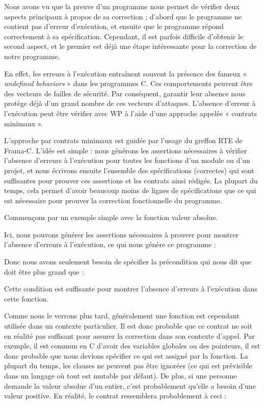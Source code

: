 Nous avons vu que la preuve d'un programme nous permet de vérifier deux aspects
principaux à propos de sa correction ; d'abord que le programme ne contient pas
d'erreur d'exécution, et ensuite que le programme répond correctement à sa
spécification. Cependant, il est parfois difficile d'obtenir le second aspect,
et le premier est déjà une étape intéressante pour la correction de notre programme.


En effet, les erreurs à l'exécution entraînent souvent la présence des fameux
« \textit{undefined behaviors} » dans les programmes C. Ces comportements peuvent être
des vecteurs de failles de sécurité. Par conséquent, garantir leur absence nous
protège déjà d'un grand nombre de ces vecteurs d'attaques. L'absence d'erreur à
l'exécution peut être vérifier avec WP à l'aide d'une approche appelée
« contrats minimaux ».




L'approche par contrats minimaux est guidée par l'usage du greffon RTE de Frama-C.
L'idée est simple : nous générons les assertions nécessaires à vérifier l'absence
d'erreurs à l'exécution pour toutes les fonctions d'un module ou d'un projet, et
nous écrivons ensuite l'ensemble des spécifications (correctes) qui sont suffisantes
pour prouver ces assertions et les contrats ainsi rédigés. La plupart du temps, cela
permet d'avoir beaucoup moins de lignes de spécifications que ce qui est nécessaire
pour prouver la correction fonctionnelle du programme.


Commençons par un exemple simple avec la fonction valeur absolue.




Ici, nous pouvons générer les assertions nécessaires à prouver pour montrer
l'absence d'erreurs à l'exécution, ce qui nous génère ce programme :




Donc nous avons seulement besoin de spécifier la précondition qui nous dit que
 doit être plus grand que  :




Cette condition est suffisante pour montrer l'absence d'erreurs à l'exécution
dans cette fonction.


Comme nous le verrons plus tard, généralement une fonction est cependant utilisée
dans un contexte particulier. Il est donc probable que ce contrat ne soit en
réalité pas suffisant pour assurer la correction dans son contexte d'appel. Par
exemple, il est commun en C d'avoir des variables globales ou des pointeurs, il
est donc probable que nous devions spécifier ce qui est assigné par la fonction.
La plupart du temps, les clauses  ne peuvent pas être ignorées
(ce qui est prévisible dans un langage où tout est mutable par défaut). De plus,
si une personne demande la valeur absolue d'un entier, c'est probablement qu'elle
a besoin d'une valeur positive. En réalité, le contrat ressemblera probablement à
ceci :



